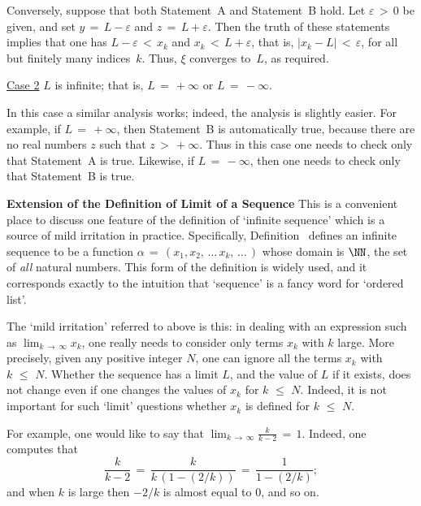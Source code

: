         Conversely, suppose that both Statement~A and Statement~B hold. Let ${\varepsilon}\,>\,0$ be given,
    and set $y \,=\, L-{\varepsilon}$ and $z \,=\, L+{\varepsilon}$. Then the truth of these statements implies that
    one has $L-{\varepsilon}\,<\,x_{k}$ and $x_{k}\,<\,L+{\varepsilon}$, that is, $|x_{k}-L|\,<\,{\varepsilon}$,  for all but finitely many indices~$k$.
    Thus, ${\xi}$ converges to~$L$, as required.

\V

        \underline{Case 2} $L$ is infinite; that is, $L \,=\, +{\infty}$ or $L \,=\, -{\infty}$.

    In this case a similar analysis works; indeed, the analysis is slightly easier. For example, if $L \,=\, +{\infty}$, then Statement~B is automatically true,
    because there are no real numbers $z$ such that $z\,>\,+{\infty}$. Thus in this case one needs to check only that Statement~A is true.
    Likewise, if $L \,=\, -{\infty}$, then one needs to check only that Statement~B is true.

\VV

        {\bf Extension of the Definition of Limit of a Sequence} This is a convenient place to discuss one feature of the definition of `infinite sequence' which is a source of mild irritation in practice.
    Specifically, Definition~ defines an infinite sequence to be a function ${\alpha} \,=\, (x_{1},x_{2},\,{\ldots}\,x_{k},\,{\ldots}\,)$ whose domain is ${\NN}$,
    the set of {\em all} natural numbers. This form of the definition is widely used, and it corresponds exactly to the intuition that `sequence' is a fancy word for `ordered list'.

        The `mild irritation' referred to above is this: in dealing with an expression such as $\lim_{k \,{\rightarrow}\, {\infty}} x_{k}$,
    one really needs to consider only terms $x_{k}$ with $k$ large. More precisely, given any positive integer $N$, one can ignore all the terms $x_{k}$ with $k\,\,{\leq}\,\,N$.
    Whether the sequence has a limit $L$, and the value of $L$ if it exists, does not change even if one changes the values of $x_{k}$ for $k\,\,{\leq}\,\,N$.
    Indeed, it is not important for such `limit' questions whether $x_{k}$ is defined for $k\,\,{\leq}\,\,N$.

        For example, one would like to say that ${\displaystyle \lim_{k \,{\rightarrow}\, {\infty}} \frac{k}{k-2} \,=\, 1}$.
    Indeed, one computes that
        \begin{displaymath}
        \frac{k}{k-2} \,=\,\frac{k}{k\,(1-(2/k))} \,=\,  \frac{1}{1-(2/k)};
        \end{displaymath}
    and when $k$ is large then $-2/k$ is almost equal to $0$, and so on.


